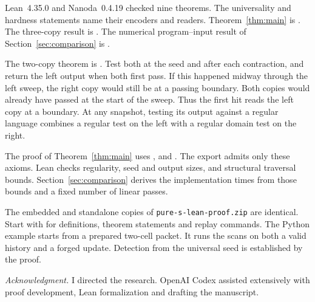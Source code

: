 {\raggedright{}\label{sec:formal}
Lean~4.35.0 and Nanoda~0.4.19 checked nine theorems. The universality and hardness statements name their encoders and readers. Theorem~\ref{thm:main} is . The three-copy result is . The numerical program--input result of Section~\ref{sec:comparison} is .

The two-copy theorem is . Test both at the seed and after each contraction, and return the left output when both first pass. If this happened midway through the left sweep, the right copy would still be at a passing boundary. Both copies would already have passed at the start of the sweep. Thus the first hit reads the left copy at a boundary. At any snapshot, testing its output against a regular language combines a regular test on the left with a regular domain test on the right.

The proof of Theorem~\ref{thm:main} uses ,  and . The export admits only these axioms. Lean checks regularity, seed and output sizes, and structural traversal bounds. Section~\ref{sec:comparison} derives the implementation times from those bounds and a fixed number of linear passes.

The embedded and standalone copies of \texttt{pure-s-lean-proof.zip} are identical. Start with  for definitions, theorem statements and replay commands. The Python example starts from a prepared two-cell packet. It runs the scans on both a valid history and a forged update. Detection from the universal seed is established by the proof.
\par}\smallskip\noindent\begin{minipage}{\columnwidth}\small \emph{Acknowledgment.} I directed the research. OpenAI Codex assisted extensively with proof development, Lean formalization and drafting the manuscript.\end{minipage}

